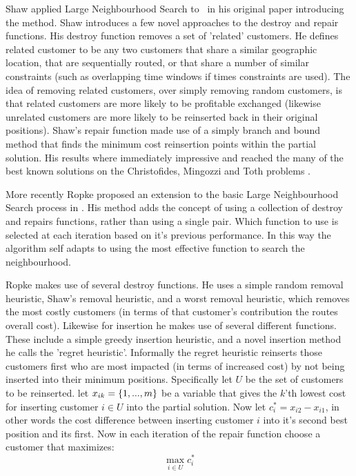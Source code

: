 Shaw applied Large Neighbourhood Search to \VRP\ in his original paper introducing the method\cite{Shaw:1998}. Shaw introduces a few novel approaches to the destroy and repair functions. His destroy function removes a set of 'related' customers. He defines related customer to be any two customers that share a similar geographic location, that are sequentially routed, or that share a number of similar constraints (such as overlapping time windows if times constraints are used). The idea of removing related customers, over simply removing random customers, is that related customers are more likely to be profitable exchanged (likewise unrelated customers are more likely to be reinserted back in their original positions). Shaw's repair function made use of a simply branch and bound method that finds the minimum cost reinsertion points within the partial solution. His results where immediately impressive and reached the many of the best known solutions on the Christofides, Mingozzi and Toth problems \cite{CMT:1981}.

More recently Ropke proposed an extension to the basic Large Neighbourhood Search process in \cite{Ropke:2005}. His method adds the concept of using a collection of destroy and repairs functions, rather than using a single pair. Which function to use is selected at each iteration based on it's previous performance. In this way the algorithm self adapts to using the most effective function to search the neighbourhood. 

Ropke makes use of several destroy functions. He uses a simple random removal heuristic, Shaw's removal heuristic, and a worst removal heuristic, which removes the most costly customers (in terms of that customer's contribution the routes overall cost). Likewise for insertion he makes use of several different functions. These include a simple greedy insertion heuristic, and a novel insertion method he calls the 'regret heuristic'. Informally the regret heuristic reinserts those customers first who are most impacted (in terms of increased cost) by not being inserted into their minimum positions. Specifically let $U$ be the set of customers to be reinserted. let $x_{ik} = \{1,...,m\}$ be a variable that gives the $k$'th lowest cost for inserting customer $i \in U$ into the partial solution. Now let $c_i^* = x_{i2} - x_{i1}$, in other words the cost difference between inserting customer $i$ into it's second best position and its first. Now in each iteration of the repair function choose a customer that maximizes:
\[
   \operatorname*{max}_{i \in U} c_i^*
\]

